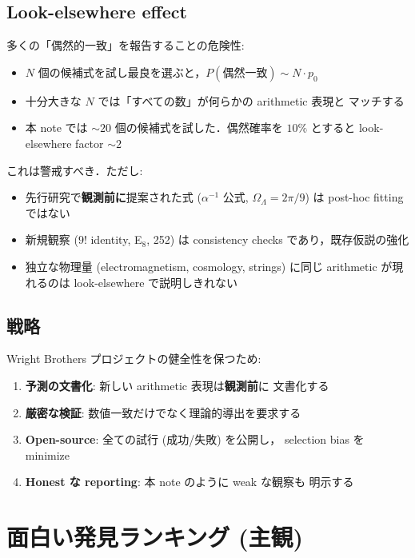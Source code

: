 \documentclass[11pt,a4paper]{article}
\begin{document}
\subsection{Look-elsewhere effect}

多くの「偶然的一致」を報告することの危険性:

\begin{itemize}
\item $N$ 個の候補式を試し最良を選ぶと，$P(\text{偶然一致}) \sim N \cdot p_0$
\item 十分大きな $N$ では「すべての数」が何らかの arithmetic 表現と
マッチする
\item 本 note では $\sim 20$ 個の候補式を試した．偶然確率を $10\%$
とすると look-elsewhere factor $\sim 2$
\end{itemize}

これは警戒すべき．ただし:
\begin{itemize}
\item 先行研究で\textbf{観測前に}提案された式 ($\alpha^{-1}$ 公式,
$\Omega_\Lambda = 2\pi/9$) は post-hoc fitting ではない
\item 新規観察 ($9!$ identity, E$_8$, 252) は consistency checks
であり，既存仮説の強化
\item 独立な物理量 (electromagnetism, cosmology, strings) に同じ
arithmetic が現れるのは look-elsewhere で説明しきれない
\end{itemize}

\subsection{戦略}

Wright Brothers プロジェクトの健全性を保つため:
\begin{enumerate}
\item \textbf{予測の文書化}: 新しい arithmetic 表現は\textbf{観測前}に
文書化する
\item \textbf{厳密な検証}: 数値一致だけでなく理論的導出を要求する
\item \textbf{Open-source}: 全ての試行 (成功/失敗) を公開し，
selection bias を minimize
\item \textbf{Honest な reporting}: 本 note のように weak な観察も
明示する
\end{enumerate}

\section{面白い発見ランキング (主観)}
\end{document}
